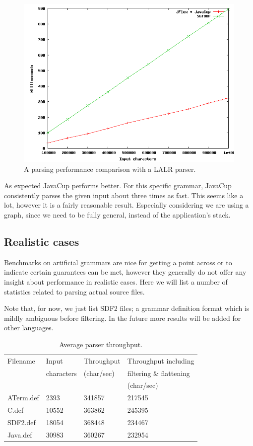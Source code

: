\documentclass[a4paper,10pt]{article}
\begin{document}
\begin{figure}[H]
\centering
\includegraphics[scale=0.5]{vsLALR.png}
\caption{A parsing performance comparison with a LALR parser.}
\end{figure}

As expected JavaCup performs better. For this specific grammar, JavaCup consistently parses the given input about three times as fast. This seems like a lot, however it is a fairly reasonable result. Especially considering we are using a graph, since we need to be fully general, instead of the application's stack.

\subsection{Realistic cases}

Benchmarks on artificial grammars are nice for getting a point across or to indicate certain guarantees can be met, however they generally do not offer any insight about performance in realistic cases. Here we will list a number of statistics related to parsing actual source files.

Note that, for now, we just list SDF2 files; a grammar definition format which is mildly ambiguous before filtering. In the future more results will be added for other languages.

\begin{table}[H]
\centering
\begin{tabular}{ | p{5em} | p{5em} | p{6em} | p{10em} |}
  \hline
  Filename & Input & Throughput & Throughput including\\
   & characters & (char/sec) & filtering \& flattening\\
   & & & (char/sec)\\
  \hline
  ATerm.def & 2393 & 341857 & 217545\\
  C.def & 10552 & 363862 & 245395\\
  SDF2.def & 18054 & 368448 & 234467\\
  Java.def & 30983 & 360267 & 232954\\
  \hline
\end{tabular}
\caption{Average parser throughput.}
\end{table}
\end{document}
